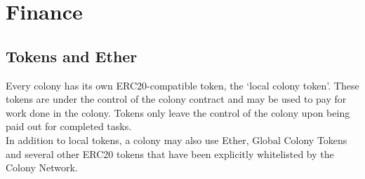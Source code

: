

\section{Finance}\label{sec:finance}





\subsection{Tokens and Ether}
Every colony has its own ERC20-compatible token, the `local colony token'. These tokens are under the control of the colony contract and may be used to pay for work done in the colony. Tokens only leave the control of the colony upon being paid out for completed tasks.\\
In addition to local tokens, a colony may also use Ether, Global Colony Tokens and several other ERC20 tokens that have been explicitly whitelisted by the Colony Network.


